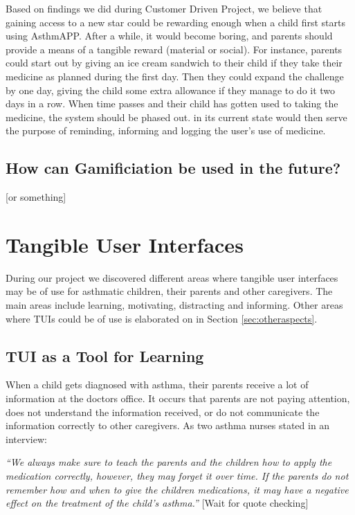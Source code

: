 Based on findings we did during Customer Driven Project\cite{CustomerDriven}, we believe that gaining access to a new star could be rewarding enough when a child first starts using AsthmAPP. After a while, it would become boring, and parents should provide a means of a tangible reward (material or social). For instance, parents could start out by giving an ice cream sandwich to their child if they take their medicine as planned during the first day. Then they could expand the challenge by one day, giving the child some extra allowance if they manage to do it two days in a row. When time passes and their child has gotten used to taking the medicine, the system should be phased out. \app{} in its current state would then serve the purpose of reminding, informing and logging the user's use of medicine.

\subsection{How can Gamificiation be used in the future?}
[or something]


\section{Tangible User Interfaces}
\label{sec:resultstui}
During our project we discovered different areas where tangible user interfaces may be of use for asthmatic children, their parents and other caregivers. The main areas include learning, motivating, distracting and informing. Other areas where TUIs could be of use is elaborated on in Section \ref{sec:otheraspects}.


\subsection{TUI as a Tool for Learning}

When a child gets diagnosed with asthma, their parents receive a lot of information at the doctors office. It occurs that parents are not paying attention, does not understand the information received, or do not communicate the information correctly to other caregivers. As two asthma nurses stated in an interview: 

\textit{``We always make sure to teach the parents and the children how to apply the medication correctly, however, they may forget it over time. If the parents do not remember how and when to give the children medications, it may have a negative effect on the treatment of the child's asthma.''}
[Wait for quote checking]

